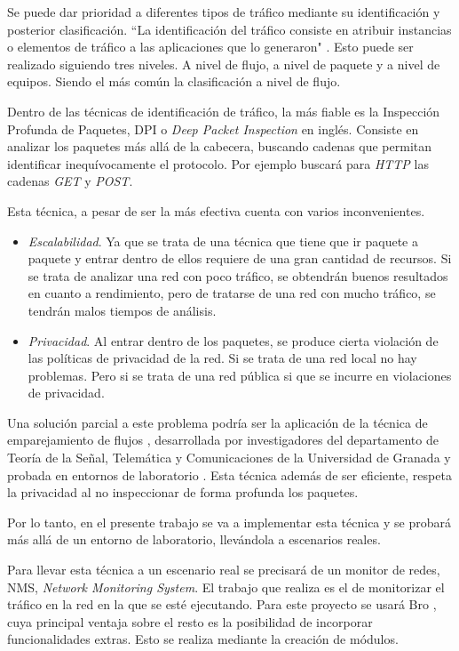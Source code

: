 \intro Se puede dar prioridad a diferentes tipos de tráfico mediante su identificación y posterior clasificación. ``La identificación 
del tráfico consiste en atribuir instancias o elementos de tráfico a las aplicaciones que lo generaron" \cite{khalife2016}. Esto puede 
ser realizado siguiendo tres niveles. A nivel de flujo, a nivel de paquete y a nivel de equipos. Siendo el más común la clasificación 
a nivel de flujo.

\intro Dentro de las técnicas de identificación de tráfico, la más fiable es la Inspección Profunda de Paquetes, DPI o \textit{Deep 
Packet Inspection} en inglés\cite{dpiaproximacion}. Consiste en analizar los paquetes más allá de la cabecera, buscando cadenas que 
permitan identificar inequívocamente el protocolo. Por ejemplo buscará para \textit{HTTP} las cadenas \textit{GET} y \textit{POST}.

\intro Esta técnica, a pesar de ser la más efectiva cuenta con varios inconvenientes.
\begin{itemize}
\item \textit{Escalabilidad}. Ya que se trata de una técnica que tiene que ir paquete a paquete y entrar dentro de ellos requiere de 
una gran cantidad de recursos. Si se trata de analizar una red con poco tráfico, se obtendrán buenos resultados en cuanto a 
rendimiento, pero de tratarse de una red con mucho tráfico, se tendrán malos tiempos de análisis.
\item \textit{Privacidad}. Al entrar dentro de los paquetes, se produce cierta violación de las políticas de privacidad de la red. Si 
se trata de una red local no hay problemas. Pero si se trata de una red pública si que se incurre en violaciones de privacidad.
\end{itemize}

\intro Una solución parcial a este problema podría ser la aplicación de la técnica de emparejamiento de flujos \cite{presentacion}, 
desarrollada por investigadores del departamento de Teoría de la Señal, Telemática y Comunicaciones de la Universidad de Granada y  
probada en entornos de laboratorio \cite{comparacion}. Esta técnica además de ser eficiente, respeta la privacidad al no inspeccionar 
de forma profunda los paquetes.

\intro Por lo tanto, en el presente trabajo se va a implementar esta técnica y se probará más allá de un entorno de laboratorio, 
llevándola a escenarios reales.

\intro Para llevar esta técnica a un escenario real se precisará de un monitor de redes, NMS, \textit{Network Monitoring System}. 
El trabajo que realiza es el de monitorizar el tráfico en la red en la que se esté ejecutando.
Para este proyecto se usará Bro \cite{broindex}, cuya principal ventaja sobre el resto es la posibilidad de incorporar funcionalidades 
extras. Esto se realiza mediante la creación de módulos.

